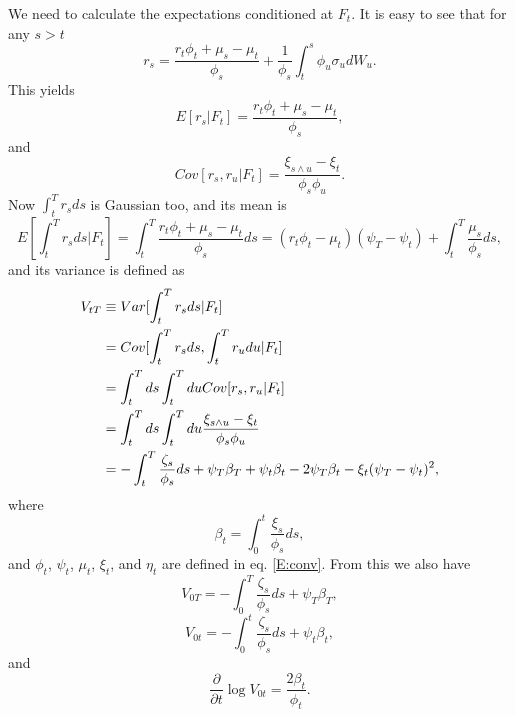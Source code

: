 We need to calculate the expectations conditioned at $F_t$. It is easy to see
that for any $s>t$
\begin{equation}
  r_s = \frac{r_t \phi_t + \mu_s-\mu_t}{\phi_s} 
       + \frac{1}{\phi_s} \int_t^s \phi_u \sigma_u dW_u.
\end{equation}
This yields
\[
  E[r_s|F_t] = \frac{r_t \phi_t + \mu_s-\mu_t}{\phi_s},
\]
and 
\[
  Cov[r_s,r_u|F_t] = \frac{\xi_{s\wedge u} -\xi_t}{\phi_s \phi_u}.
\]
Now $\int_t^T r_s ds$ is Gaussian too, and its mean is
\[
  E[\int_t^T r_s ds|F_t] 
    = \int_t^T \frac{r_t \phi_t + \mu_s-\mu_t}{\phi_s} ds
    = (r_t \phi_t-\mu_t)(\psi_T-\psi_t) + \int_t^T \frac{\mu_s}{\phi_s}ds,
\]
and its variance is defined as
\begin{align*}
  V_{tT} 
   &\equiv Var[\int_t^T r_s ds|F_t] \notag \\
   &= Cov[\int_t^T r_s ds, \int_t^T r_u du|F_t] \notag \\
   &= \int_t^T ds \int_t^T du Cov[r_s,r_u|F_t] \notag \\
   &= \int_t^T ds \int_t^T du  \frac{\xi_{s\wedge u} -\xi_t}{\phi_s \phi_u} 
      \notag \\
   &= -\int_t^T \frac{\zeta_s}{\phi_s} ds + \psi_T \beta_T 
     + \psi_t \beta_t - 2 \psi_T \beta_t - \xi_t(\psi_T-\psi_t)^2, \notag \\
\end{align*}
where 
\begin{equation} \label{E:conv2}
  \beta_t=\int_0^t \frac{\xi_s}{\phi_s} ds,
\end{equation}
and $\phi_t$, $\psi_t$, $\mu_t$, $\xi_t$, and $\eta_t$ are defined 
in eq. \ref{E:conv}. From this we also have
\[
  V_{0T} = -\int_0^T \frac{\zeta_s}{\phi_s} ds + \psi_T \beta_T,
\]
\[
  V_{0t} = -\int_0^t \frac{\zeta_s}{\phi_s} ds + \psi_t \beta_t,
\]
and
\begin{equation} \label{E:dev_V}
  \frac{\partial}{\partial t} \log V_{0t} = \frac{2\beta_t}{\phi_t}.
\end{equation}

